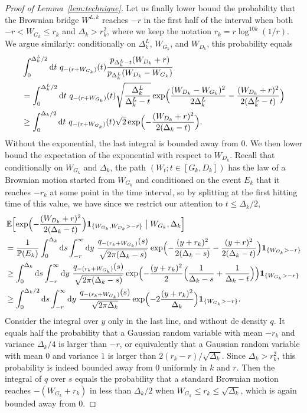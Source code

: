 \documentclass[10pt,a4paper]{amsart}
\newcommand{\E}{\mathop{}\!\mathbb{E}}
\newcommand{\ind}[1]{\mathbf{1}_{\{#1\}}}
\renewcommand{\P}{\mathop{}\!\mathbb{P}}
\renewcommand{\d}{\mathrm{d}}
\begin{document}
\begin{proof}[Proof of Lemma~\ref{lem:technique}]
Let us finally lower bound the probability that the Brownian bridge $W^{L,k}$ reaches $-r$ in the first half of the interval when both $-r < W_{G_k} \leq r_{k}$ and $\Delta_k > r_{k}^2$, where we keep the notation $r_{k}=r \log^{10k}(1/r)$.
We argue similarly: conditionally on $\Delta^L_k$, $W_{G_k}$, and $W_{D_k}$, this probability equals
\begin{align*}
&\int_0^{\Delta^L_k/2} \d t\ q_{-(r+W_{G_k})}(t) \frac{p_{\Delta^L_k-t}(W_{D_k}+r)}{p_{\Delta^L_k}(W_{D_k}-W_{G_k})}\\
&= \int_0^{\Delta^L_k/2} \d t\ q_{-(r+W_{G_k})}(t) \sqrt{\frac{\Delta^L_k}{\Delta^L_k-t}} \exp\Bigl(\frac{(W_{D_k}-W_{G_k})^2}{2 \Delta^L_k} - \frac{(W_{D_k}+r)^2}{2(\Delta^L_k-t)}\Bigr)
\\
&\geq \int_0^{\Delta_k/2} \d t\ q_{-(r+W_{G_k})}(t) \sqrt{2} \exp\Bigl(- \frac{(W_{D_k}+r)^2}{2 (\Delta_k-t)}\Bigr)
.\end{align*}
Without the exponential, the last integral is bounded away from $0$.
We then lower bound the expectation of the exponential with respect to $W_{D_k}$.
Recall that conditionally on $W_{G_k}$ and $\Delta_k$, the path $(W_t; t \in [G_k, D_k])$ has the law of a Brownian motion started from $W_{G_k}$ and conditioned on the event $E_k$ that it reaches $-r_{k}$ at some point in the time interval, so by splitting at the first hitting time of this value, we have since we restrict our attention to $t \leq \Delta_k/2$,
\begin{align*}
&\E\Bigl[\exp\Bigl(- \frac{(W_{D_k}+r)^2}{2(\Delta_k-t)}\Bigr) \ind{W_{G_k}, W_{D_k}>-r} \bigm| W_{G_k}, \Delta_k\Bigr]
\\
&= \frac{1}{\P(E_k)} \int_0^{\Delta_k} \d s \int_{-r}^\infty \d y\ \frac{q_{-(r_{k}+W_{G_k})}(s)}{\sqrt{2\pi(\Delta_k-s)}} \exp\Bigl(- \frac{(y+r_{k})^2}{2(\Delta_k-s)} - \frac{(y+r)^2}{2 (\Delta_k-t)}\Bigr) \ind{W_{G_k}>-r}
\\
&\geq \int_0^{\Delta_k} \d s \int_{-r}^\infty \d y\ \frac{q_{-(r_{k}+W_{G_k})}(s)}{\sqrt{2 \pi(\Delta_k-s)}} \exp\Bigl(- \frac{(y+r_{k})^2}{2} \Bigl(\frac{1}{\Delta_k-s}+\frac{1}{\Delta_k-t}\Bigr)\Bigr) \ind{W_{G_k}>-r}
\\
&\geq \int_0^{\Delta_k/2} \d s \int_{-r}^\infty \d y\ \frac{q_{-(r_{k}+W_{G_k})}(s)}{\sqrt{2 \pi \Delta_k}} \exp\Bigl(- 2 \frac{(y+r_{k})^2}{\Delta_k}\Bigr) \ind{W_{G_k}>-r}
.\end{align*}
Consider the integral over $y$ only in the last line, and without de density $q$. It equals half the probability that a Gaussian random variable with mean $-r_{k}$ and variance $\Delta_k/4$ is larger than $-r$, or equivalently that a Gaussian random variable with mean $0$ and variance $1$ is larger than $2(r_{k}-r)/\sqrt{\Delta_k}$. Since $\Delta_k > r_{k}^2$, this probability is indeed bounded away from $0$ uniformly in $k$ and $r$.
Then the integral of $q$ over $s$ equals the probability that a standard Brownian motion reaches $-(W_{G_k}+r_{k})$ in less than $\Delta_k/2$ when $W_{G_k} \leq r_{k} \leq \sqrt{\Delta_k}$, which is again bounded away from $0$.


\end{proof}
\end{document}
